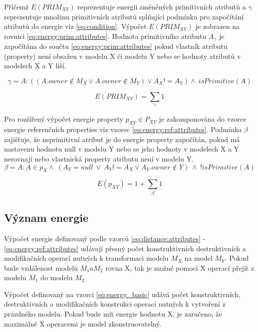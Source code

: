 \documentclass[11pt,twoside,a4paper]{book}
\begin{document}
Přičemž $E(PRIM_{XY})$ reprezentuje energii změněných primitivních atributů a
$\gamma$ reprezentuje množinu primitivních atributů splňující podmínku
 pro započítání atributů do energie viz \eqref{eq:condition}.
 Výpočet $E(PRIM_{XY})$ je zobrazen na rovnici
 \eqref{eq:energy:prim:attributes}. Hodnota primitivního atributu $A_\gamma$ je
 započítána do součtu \eqref{eq:energy:prim:attributes} pokud vlastník atributu
 (property) není obsažen v modelu X či modelu Y nebo se hodnoty atributů v
 modelech X a Y liší.

\begin{equation}\gamma=A: ((A.owner \notin M_{X} \vee A.owner \notin M_{Y})
\vee A_{X} != A_{Y}) \wedge \ isPrimitive(A)  \label{eq:condition}\end{equation}

\begin{equation}E(PRIM_{XY}) =
\sum_{\gamma}1
\label{eq:energy:prim:attributes}\end{equation}

Pro rozšířený výpočet energie property $p_{XY} \in P_{XY}$ je zakomponována do
vzorce energie referenčních properties viz vzorec
\ref{eq:energy:ref:attributes}. Podmínka $\beta$ zajišťuje, že
neprimitivní atribut je do energie property započítán, pokud má nastavenu
hodnotu null v modelu Y nebo se jeho hodnoty v modelech X a Y nerovnají nebo
vlastnická property atributu není v modelu Y.
\begin{equation}\beta = A :
A \in p_X \wedge \ (A_Y = null \ \vee \ A_Y != A_X \vee A_Y.owner \notin Y)\
\wedge \ !isPrimitive(A) \end{equation} 

\begin{equation}E(p_{XY}) = 1 + \sum_\beta
 1
 \label{eq:energy:ref:attributes}\end{equation}


\subsection{Význam energie}

Výpočet energie definovaný podle vzorců \eqref{eq:distance:attributes} -
\eqref{eq:energy:ref:attributes} udávají přesný počet konstruktivních
destruktivních a modifikačních operací nutných k transformaci modelu $M_X$ na
model $M_Y$. Pokud bude vzdálenost modelů $M_1 a M_2$
rovna X, tak je možné pomocí X operací přejít z modelu $M_1$ do modelu $M_2$

Výpočet definovaný na vzorci \eqref{eq:energy_basic} udává počet
konstruktivních, destruktivních a modifikačních konstrukci operací nutných k
vytvoření z prázdného modelu. Pokud bude mít energie hodnotu X, je zaručeno, že
maximálně X operacemi je model zkonstruovatelný.
\end{document}
